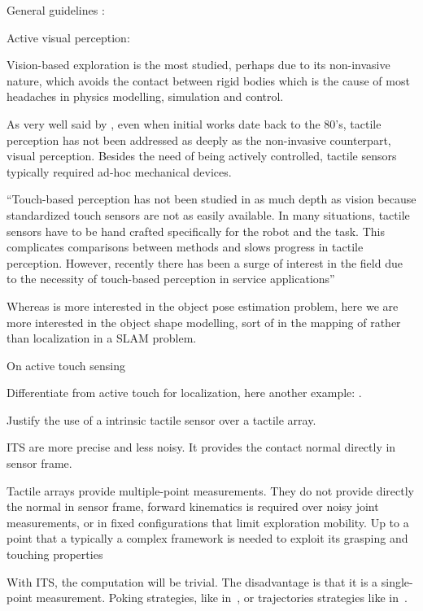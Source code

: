  

General guidelines : \citet{Bajcsy1989Machine}

Active visual perception: \citet{Bajcsy1988Active}

Vision-based exploration is the most studied, perhaps due to its non-invasive nature, which avoids the contact between rigid bodies which is the cause of most headaches in physics modelling, simulation and control.

As very well said by \citet{Petrovskaya2011Global}, even when initial works date back to the 80's, tactile perception has not been addressed as deeply as the non-invasive counterpart, visual perception. Besides the need of being actively controlled, tactile sensors typically required ad-hoc mechanical devices.

``Touch-based perception has not been studied in as much depth
as vision because standardized touch sensors are not as easily
available. In many situations, tactile sensors have to be hand
crafted specifically for the robot and the task. This complicates
comparisons between methods and slows progress in tactile
perception. However, recently there has been a surge of interest
in the field due to the necessity of touch-based perception in
service applications''

Whereas \citet{Petrovskaya2011Global} is more interested in the object pose estimation problem, here we are more interested in the object shape modelling, sort of in the mapping of rather than localization in a SLAM problem.

On active touch sensing \citet{Prescott2011Active}

Differentiate from active touch for localization, here another example: \citet{Hebert2013Next}.

Justify the use of a intrinsic tactile sensor over a tactile array.

ITS are more precise and less noisy. It provides the contact normal directly in sensor frame.

Tactile arrays provide multiple-point measurements. They do not provide directly the normal in sensor frame, forward kinematics is required over noisy joint measurements, or in fixed configurations that limit exploration mobility. Up to a point that a typically a complex framework is needed to exploit its grasping and touching properties %

With ITS, the computation will be trivial. The disadvantage is that it is a single-point measurement. Poking strategies, like in~\citet{Petrovskaya2011Global}, or trajectories strategies like in~\citet{Rosales2014Active}.

